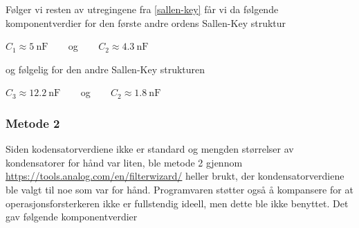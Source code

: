 Følger vi resten av utregingene fra \ref{sallen-key} får vi da følgende komponentverdier for den første 
andre ordens Sallen-Key struktur
\begin{center}
    $C_1 \approx \SI{5}{\nano\farad}\:\:\:\:\:\:\:\:$ og $\:\:\:\:\:\:\:\:C_2 \approx \SI{4.3}{\nano\farad}$
\end{center}

og følgelig for den andre Sallen-Key strukturen
\begin{center}
    $C_3 \approx \SI{12.2}{\nano\farad}\:\:\:\:\:\:\:\:$ og $\:\:\:\:\:\:\:\:C_2 \approx \SI{1.8}{\nano\farad}$
\end{center}

\subsubsection{Metode 2}
Siden kodensatorverdiene ikke er standard og mengden størrelser av kondensatorer for hånd var liten, ble 
metode 2 gjennom \url{https://tools.analog.com/en/filterwizard/} heller brukt, der kondensatorverdiene ble valgt 
til noe som var for hånd. Programvaren støtter også å kompansere for at operasjonsforsterkeren ikke er fullstendig 
ideell, men dette ble ikke benyttet. Det gav følgende komponentverdier

